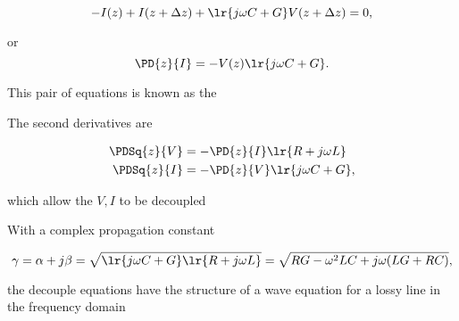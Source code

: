 \begin{dmath}\label{eqn:uwaves4TransmissionLines:60}
-I(z) + I(z + \Delta z) + \lr{ j \omega C + G} V(z + \Delta z) = 0,
\end{dmath}

or
\begin{dmath}\label{eqn:uwaves4TransmissionLines:80}
\PD{z}{I} = -V(z) \lr{ j \omega C + G}.
\end{dmath}

This pair of equations is known as the 


The second derivatives are

\begin{equation}\label{eqn:uwaves4TransmissionLines:120}
\begin{aligned}
\PDSq{z}{V} &= -\PD{z}{I} \lr{ R + j \omega L } \\
\PDSq{z}{I} &= -\PD{z}{V} \lr{ j \omega C + G},
\end{aligned}
\end{equation}

which allow the \( V, I \) to be decoupled

With a complex propagation constant

\begin{dmath}\label{eqn:uwaves4TransmissionLines:160}
\gamma
= \alpha + j \beta 
= \sqrt{ \lr{ j \omega C + G} \lr{ R + j \omega L } } 
= 
\sqrt{ R G - \omega^2 L C + j \omega ( L G + R C ) },
\end{dmath}

the decouple equations have the structure of a wave equation for a lossy line in the frequency domain



